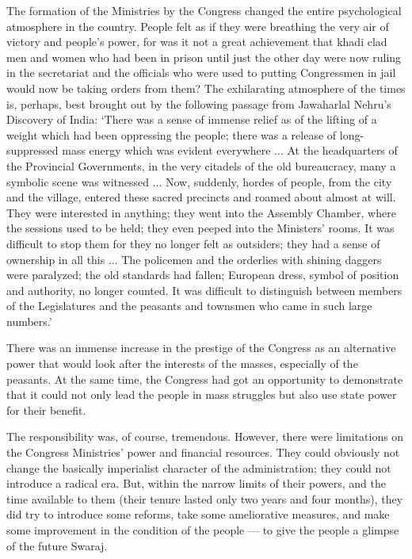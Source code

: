 The formation of the Ministries by the Congress changed the entire psychological atmosphere in the country. People felt as if they were breathing the very air of victory and people's power, for was it not a great achievement that khadi clad men and women who had been in prison until just the other day were now ruling in the secretariat and the officials who were used to putting Congressmen in jail would now be taking orders from them? The exhilarating atmosphere of the times is, perhaps, best brought out by the following passage from Jawaharlal Nehru's Discovery of India: `There was a sense of immense relief as of the lifting of a weight which had been oppressing the people; there was a release of long- suppressed mass energy which was evident everywhere ... At the headquarters of the Provincial Governments, in the very citadels of the old bureaucracy, many a symbolic scene was witnessed ... Now, suddenly, hordes of people, from the city and the village, entered these sacred precincts and roamed about almost at will. They were interested in anything; they went into the Assembly Chamber, where the sessions used to be held; they even peeped into the Ministers' rooms. It was difficult to stop them for they no longer felt as outsiders; they had a sense of ownership in all this ... The policemen and the orderlies with shining daggers were paralyzed; the old standards had fallen; European dress, symbol of position and authority, no longer counted. It was difficult to distinguish between members of the Legislatures and the peasants and townsmen who came in such large numbers.' 

There was an immense increase in the prestige of the Congress as an alternative power that would look after the interests of the masses, especially of the peasants. At the same time, the Congress had got an opportunity to demonstrate that it could not only lead the people in mass struggles but also use state power for their benefit. 

The responsibility was, of course, tremendous. However, there were limitations on the Congress Ministries' power and financial resources. They could obviously not change the basically imperialist character of the administration; they could not introduce a radical era. But, within the narrow limits of their powers, and the time available to them (their tenure lasted only two years and four months), they did try to introduce some reforms, take some ameliorative measures, and make some improvement in the condition of the people --- to give the people a glimpse of the future Swaraj. 

